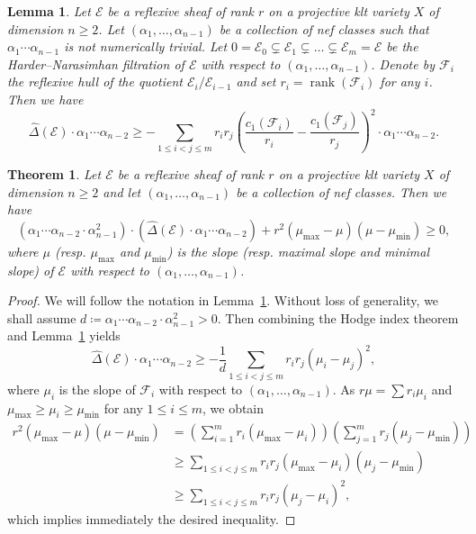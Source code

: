 \documentclass[10pt,a4paper]{amsart}
\newtheorem{lem}{Lemma}
\newtheorem{thm}{Theorem}
\DeclareMathOperator{\rank}{rank}
\begin{document}
\begin{lem}
	\label{lem.LangerIneqI}
	Let $\mathcal{E}$ be a reflexive sheaf of rank $r$ on a projective klt variety $X$ of dimension $n\geq 2$. Let $(\alpha_1,\dots,\alpha_{n-1})$ be a collection of nef classes such that $\alpha_1\cdots \alpha_{n-1}$ is not numerically trivial. Let $0=\mathcal{E}_0\subsetneq \mathcal{E}_1\subsetneq \dots\subsetneq \mathcal{E}_m=\mathcal{E}$ be the Harder--Narasimhan filtration of $\mathcal{E}$ with respect to $(\alpha_1,\dots,\alpha_{n-1})$. Denote by $\mathcal{F}_i$ the reflexive hull of the quotient $\mathcal{E}_i/\mathcal{E}_{i-1}$ and set $r_i=\rank(\mathcal{F}_i)$ for any $i$. Then we have
	\begin{equation}
		\label{eq.LangerIneqI}
	\hat{\Delta}(\mathcal{E})\cdot \alpha_1\cdots\alpha_{n-2} \geq - \sum_{1\leq i<j\leq m} r_i r_j \left(\frac{c_1(\mathcal{F}_i)}{r_i}-\frac{c_1(\mathcal{F}_j)}{r_j}\right)^2\cdot \alpha_1\cdots\alpha_{n-2}.
	\end{equation}
\end{lem}

\begin{thm}
	\label{thm.LangerIneqII}
	Let $\mathcal{E}$ be a reflexive sheaf of rank $r$ on a projective klt variety $X$ of dimension $n\geq 2$ and let $(\alpha_1,\dots,\alpha_{n-1})$ be a collection of nef classes. Then we have
	\[
	(\alpha_1\cdots \alpha_{n-2} \cdot \alpha_{n-1}^2) \cdot(\hat{\Delta}(\mathcal{E})\cdot \alpha_1\cdots\alpha_{n-2}) + r^2 (\mu_{\max} - \mu) (\mu-\mu_{\min}) \geq 0,
	\]
	where $\mu$ (resp. $\mu_{\max}$ and $\mu_{\min}$) is the slope (resp. maximal slope and minimal slope) of $\mathcal{E}$ with respect to $(\alpha_1,\dots,\alpha_{n-1})$.
\end{thm}

\begin{proof}
	We will follow the notation in Lemma~\ref{lem.LangerIneqI}. Without loss of generality, we shall assume $d\coloneqq \alpha_1\cdots \alpha_{n-2}\cdot \alpha_{n-1}^2>0$. Then combining the Hodge index theorem and Lemma~\ref{lem.LangerIneqI} yields
	\[
		\hat{\Delta}(\mathcal{E})\cdot \alpha_1\cdots\alpha_{n-2} 
		 \geq - \frac{1}{d} \sum_{1\leq i<j\leq m} r_i r_j (\mu_i-\mu_j)^2,
	\]
	where $\mu_i$ is the slope of $\mathcal{F}_i$ with respect to $(\alpha_1,\dots,\alpha_{n-1})$. As $r\mu=\sum r_i\mu_i$ and $\mu_{\max}\geq \mu_i\geq \mu_{\min}$ for any $1\leq i\leq m$, we obtain
	\begin{align*}
		r^2(\mu_{\max}-\mu) (\mu-\mu_{\min})
		 & = \left(\sum_{i=1}^{m} r_i (\mu_{\max} - \mu_i)\right) \left(\sum_{j=1}^{m} r_j(\mu_j - \mu_{\min})\right) \\
		 & \geq \sum_{1\leq i < j\leq m} r_i r_j (\mu_{\max}-\mu_i) (\mu_j-\mu_{\min}) \\
		 & \geq \sum_{1\leq i<j\leq m} r_i r_j (\mu_j - \mu_i)^2,
	\end{align*}
	which implies immediately the desired inequality.
\end{proof}
\end{document}
